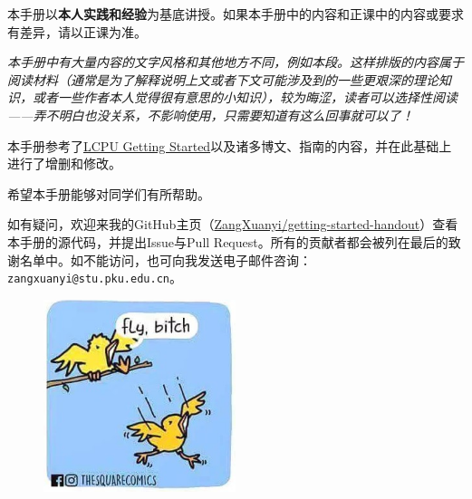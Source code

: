 \documentclass[../main.tex]{subfiles}
\begin{document}
本手册以\textbf{本人实践和经验}为基底讲授。如果本手册中的内容和正课中的内容或要求有差异，请以正课为准。

\emph{本手册中有大量内容的文字风格和其他地方不同，例如本段。这样排版的内容属于阅读材料（通常是为了解释说明上文或者下文可能涉及到的一些更艰深的理论知识，或者一些作者本人觉得很有意思的小知识），较为晦涩，读者可以选择性阅读——弄不明白也没关系，不影响使用，只需要知道有这么回事就可以了！}

本手册参考了\href{https://missing.lcpu.dev}{LCPU Getting Started}以及诸多博文、指南的内容，并在此基础上进行了增删和修改。

希望本手册能够对同学们有所帮助。

如有疑问，欢迎来我的GitHub主页（\faGithub\href{https://github.com/ZangXuanyi/getting-started-handout}{ZangXuanyi/getting-started-handout}）查看本手册的源代码，并提出Issue与Pull Request。所有的贡献者都会被列在最后的致谢名单中。如不能访问，也可向我发送电子邮件咨询：\texttt{zangxuanyi@stu.pku.edu.cn}。

\begin{figure}[ht]
  \centering
  \includegraphics[width=0.5\textwidth]{images/fly.jpg}
\end{figure}
\end{document}
